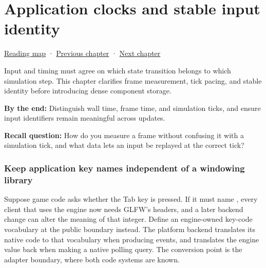 \chapter{Application clocks and stable input identity}\label{05-engine-i-ch014-application-clocks-and-stable-input-identity}\hypertarget{05-engine-i-ch014}{}\label{stagechapter:05-engine-i-ch014}

\hypertarget{05-engine-i-ch014-application-clocks-and-stable-input-identity}{}

\hyperref[volume-reading-map]{Reading map} · \hyperref[05-engine-i-ch013-portable-startup-windows-events-and-input]{Previous chapter} · \hyperref[05-engine-i-ch015-sparse-set-components-and-generational-entity-handles]{Next chapter}

Input and timing must agree on which state transition belongs to which simulation step. This chapter clarifies frame measurement, tick pacing, and stable identity before introducing dense component storage.

\textbf{By the end:} Distinguish wall time, frame time, and simulation ticks, and ensure input identifiers remain meaningful across updates.

\textbf{Recall question:} How do you measure a frame without confusing it with a simulation tick, and what data lets an input be replayed at the correct tick?

\subsection{Keep application key names independent of a windowing library}\label{05-engine-i-ch014-keep-application-key-names-independent-of-a-windowing-library}

\hypertarget{05-engine-i-ch014-keep-application-key-names-independent-of-a-windowing-library}{}

Suppose game code asks whether the Tab key is pressed. If it must name , every client that uses the engine now needs GLFW's headers, and a later backend change can alter the meaning of that integer. Define an engine-owned key-code vocabulary at the public boundary instead. The platform backend translates its native code to that vocabulary when producing events, and translates the engine value back when making a native polling query. The conversion point is the adapter boundary, where both code systems are known.

